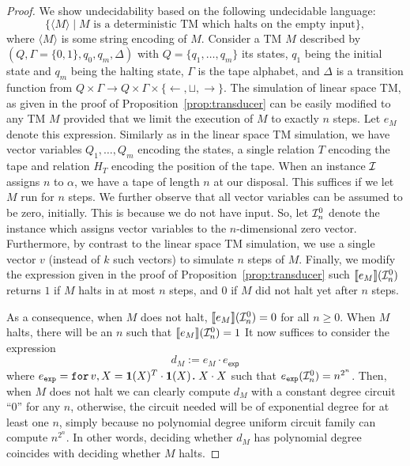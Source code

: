 \begin{proof}
    We show undecidability based on the following undecidable language:
    $$
    \{ \langle M\rangle\mid \text{$M$ is a deterministic TM which halts on the empty input}\},
    $$
    where $\langle M\rangle$ is some string encoding of $M$.
    Consider a TM $M$ described by $(Q,\Gamma=\{0,1\},q_0,q_m,\Delta)$
    with $Q=\{q_1,\ldots,q_m\}$ its states, $q_1$ being the initial state and $q_m$ being
    the halting state, $\Gamma$ is the tape alphabet, and $\Delta$ is a transition function
    from $Q\times \Gamma\to Q\times\Gamma\times \{\leftarrow,\sqcup,\rightarrow\}$. The simulation
    of linear space TM, as given in the proof of Proposition~\ref{prop:transducer} can be easily modified to
    any TM $M$ provided that we limit the execution of $M$ to exactly $n$ steps. Let $e_M$ denote this expression. Similarly
    as in the linear space TM simulation, we have vector variables $Q_1,\ldots,Q_m$ encoding the
    states, a single relation $T$ encoding the tape and relation $H_T$ encoding the position
    of the tape.  When an instance $\mathcal{I}$ assigns $n$ to $\alpha$, we have a tape of length $n$ at our disposal. This suffices if we let $M$ run for $n$ steps. We further observe that all vector variables can be assumed to be zero, initially.
    This is because we do not have input. So, let $\mathcal{I}_n^0$ denote the instance which assigns vector variables to the $n$-dimensional zero vector.  Furthermore, by contrast to the linear space TM simulation, we use a single vector $v$ (instead of $k$ such vectors) to simulate $n$ steps of $M$. Finally, we modify the expression given in the proof of Proposition~\ref{prop:transducer} such $\llbracket e_M \rrbracket(\mathcal{I}_n^0)$  returns $1$ if $M$
    halts in at most $n$ steps, and $0$ if $M$ did not halt yet after $n$ steps.

    As a consequence, when $M$ does not halt, $\llbracket e_M \rrbracket(\mathcal{I}_n^0)=0$ for all $n\geq 0$. When $M$ halts, there will be an $n$ such that $\llbracket e_M \rrbracket(\mathcal{I}_n^0)=1$ It now suffices to consider the \langfor expression
    $$
    d_M:=e_M\cdot e_{\mathsf{exp}}
    $$
    where $e_{\texttt{exp}} = \texttt{for}\, v,X=\mathbf{1}(X)^T\cdot\mathbf{1}(X) \texttt{.}\, X\cdot X$ such that
    $e_{\texttt{exp}}(\mathcal{I}_n^0)=n^{2^n}$. Then, when $M$ does not halt we can clearly compute $d_M$ with a constant degree circuit ``0''
    for any $n$, otherwise, the circuit needed will be of exponential degree
    for at least one $n$, simply because no polynomial degree uniform  circuit family can compute $n^{2^n}$. In other words, deciding whether $d_M$ has polynomial degree coincides with deciding whether $M$ halts.
\end{proof}